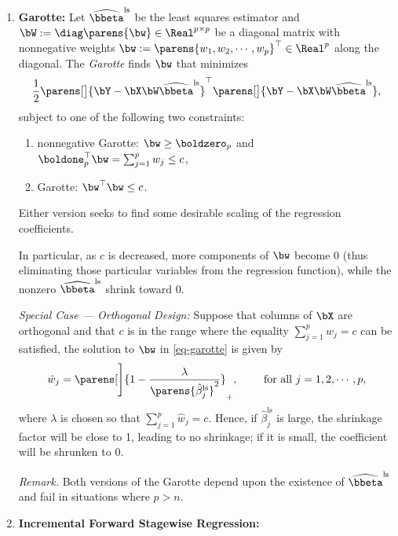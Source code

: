 \documentclass[12pt]{article}
\begin{document}
\begin{enumerate}[label=\textbf{\arabic*.}]
	
	\item \textbf{Garotte:} Let $\widehat{\bbeta}^{\mathrm{ls}}$ be the least squares estimator and $\bW := \diag \parens{\bw} \in \Real^{p \times p}$ be a diagonal matrix with nonnegative weights $\bw := \parens{w_1, w_2, \cdots, w_p}^\top \in \Real^p$ along the diagonal. The \textit{Garotte} finds $\bw$ that minimizes 
	\begin{align}\label{eq-garotte}
		\frac{1}{2} \parens[\big]{\bY - \bX \bW \widehat{\bbeta}^{\mathrm{ls}}}^\top \parens[\big]{\bY - \bX \bW \widehat{\bbeta}^{\mathrm{ls}}}, 
	\end{align}
	subject to one of the following two constraints: 
	\begin{enumerate}
		\item nonnegative Garotte: $\bw \ge \boldzero_p$ and $\boldone_p^\top \bw = \sum_{j=1}^p w_j \le c$, 
		\item Garotte: $\bw^\top \bw \le c$. 
	\end{enumerate}
	Either version seeks to find some desirable scaling of the regression coefficients. 
	
	In particular, as $c$ is decreased, more components of $\bw$ become 0 (thus eliminating those particular variables from the regression function), while the nonzero $\widehat{\bbeta}^{\mathrm{ls}}$ shrink toward 0. 
	
	\textit{Special Case --- Orthogonal Design:} Suppose that columns of $\bX$ are orthogonal and that $c$ is in the range where the equality $\sum_{j=1}^p w_j = c$ can be satisfied, the solution to $\bw$ in \eqref{eq-garotte} is given by 
	\begin{align*}
		\hat{w}_j = \parens[\Bigg]{1 - \frac{\lambda}{\parens{\hat{\beta}_j^{\mathrm{ls}}}^2}}_+, \qquad \text{ for all } j = 1, 2, \cdots, p, 
	\end{align*}
	where $\lambda$ is chosen so that $\sum_{j=1}^p \hat{w}_j = c$. Hence, if $\hat{\beta}_j^{\mathrm{ls}}$ is large, the shrinkage factor will be close to 1, leading to no shrinkage; if it is small, the coefficient will be shrunken to 0. 
	
	\textit{Remark.} Both versions of the Garotte depend upon the existence of $\widehat{\bbeta}^{\mathrm{ls}}$ and fail in situations where $p > n$. 
	
	\item \textbf{Incremental Forward Stagewise Regression:} 
	

\end{enumerate}
\end{document}
